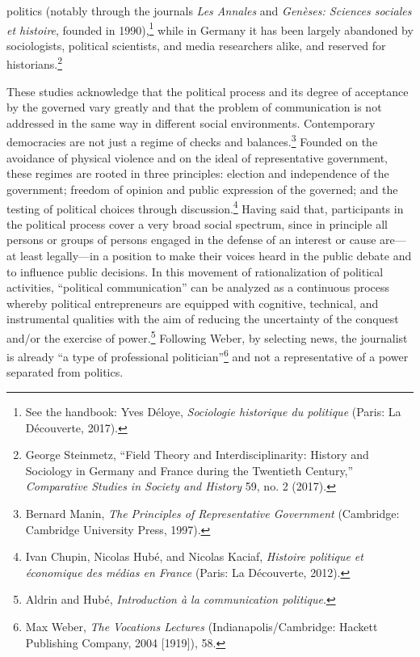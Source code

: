\documentclass{tufte-handout}
\begin{document}
politics (notably through the journals \emph{Les Annales} and
\emph{Genèses: Sciences sociales et histoire}, founded in
1990),\footnote{See the handbook: Yves Déloye, \emph{Sociologie
  historique du politique} (Paris: La Découverte, 2017).} while in
Germany it has been largely abandoned by sociologists, political
scientists, and media researchers alike, and reserved for
historians.\footnote{George Steinmetz, ``Field Theory and
  Interdisciplinarity: History and Sociology in Germany and France
  during the Twentieth Century,'' \emph{Comparative Studies in Society
  and History} 59, no. 2 (2017).}

These studies acknowledge that the political process and its degree of
acceptance by the governed vary greatly and that the problem of
communication is not addressed in the same way in different social
environments. Contemporary democracies are not just a regime of checks
and balances.\footnote{Bernard Manin, \emph{The Principles of
  Representative Government} (Cambridge: Cambridge University Press,
  1997).} Founded on the avoidance of physical violence and on the ideal
of representative government, these regimes are rooted in three
principles: election and independence of the government; freedom of
opinion and public expression of the governed; and the testing of
political choices through discussion.\footnote{Ivan Chupin, Nicolas
  Hubé, and Nicolas Kaciaf, \emph{Histoire politique et économique des
  médias en France} (Paris: La Découverte, 2012).} Having said that,
participants in the political process cover a very broad social
spectrum, since in principle all persons or groups of persons engaged in
the defense of an interest or cause are---at least legally---in a
position to make their voices heard in the public debate and to
influence public decisions. In this movement of rationalization of
political activities, ``political communication'' can be analyzed as a
continuous process whereby political entrepreneurs are equipped with
cognitive, technical, and instrumental qualities with the aim of
reducing the uncertainty of the conquest and/or the exercise of
power.\footnote{Aldrin and Hubé, \emph{Introduction à la communication
  politique}.} Following Weber, by selecting news, the journalist is
already ``a type of professional politician''\footnote{Max Weber,
  \emph{The} \emph{Vocations Lectures} (Indianapolis/Cambridge: Hackett
  Publishing Company, 2004 {[}1919{]}), 58.} and not a representative of
a power separated from politics.
\end{document}
